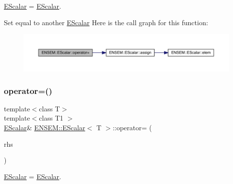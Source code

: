 \mbox{\hyperlink{classENSEM_1_1EScalar}{E\+Scalar}} = \mbox{\hyperlink{classENSEM_1_1EScalar}{E\+Scalar}}. 

Set equal to another \mbox{\hyperlink{classENSEM_1_1EScalar}{E\+Scalar}} Here is the call graph for this function\+:
\nopagebreak
\begin{figure}[H]
\begin{center}
\leavevmode
\includegraphics[width=350pt]{d0/d82/classENSEM_1_1EScalar_a8ec804b8b082a748bb364fbb4a511757_cgraph}
\end{center}
\end{figure}
\mbox{\label{classENSEM_1_1EScalar_a8ec804b8b082a748bb364fbb4a511757}} 
\subsubsection{\texorpdfstring{operator=()}{operator=()}\hspace{0.1cm}{\footnotesize\ttfamily [8/8]}}
{\footnotesize\ttfamily template$<$class T$>$ \\
template$<$class T1 $>$ \\
\mbox{\hyperlink{classENSEM_1_1EScalar}{E\+Scalar}}\& \mbox{\hyperlink{classENSEM_1_1EScalar}{E\+N\+S\+E\+M\+::\+E\+Scalar}}$<$ T $>$\+::operator= (\begin{DoxyParamCaption}\item[{const \mbox{\hyperlink{classENSEM_1_1EScalar}{E\+Scalar}}$<$ T1 $>$ \&}]{rhs }\end{DoxyParamCaption})\hspace{0.3cm}{\ttfamily [inline]}}



\mbox{\hyperlink{classENSEM_1_1EScalar}{E\+Scalar}} = \mbox{\hyperlink{classENSEM_1_1EScalar}{E\+Scalar}}. 


